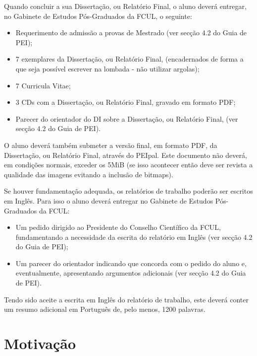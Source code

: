 Quando concluir a sua Dissertação, ou Relatório Final, o aluno deverá entregar, no Gabinete de Estudos Pós-Graduados da FCUL, o seguinte:

\begin{itemize}
\item Requerimento de admissão a provas de Mestrado (ver secção 4.2 do Guia de PEI);
\item 7 exemplares da Dissertação, ou Relatório Final, (encadernados de forma a que seja possível escrever na lombada - não utilizar argolas);
\item 7 Curricula Vitae;
\item 3 CDs com a Dissertação, ou Relatório Final, gravado em formato PDF;
\item Parecer do orientador do DI sobre a Dissertação, ou Relatório Final, (ver secção 4.2 do Guia de PEI).
\end{itemize}

O aluno deverá também submeter a versão final, em formato PDF, da Dissertação, ou Relatório Final, através do PEIpal. Este documento não deverá, em condições normais, exceder os 5MiB (se isso acontecer então deve ser revista a qualidade das imagens evitando a inclusão de bitmaps).

Se houver fundamentação adequada, os relatórios de trabalho poderão ser escritos em Inglês. Para isso o aluno deverá entregar no Gabinete de Estudos Pós-Graduados da FCUL:

\begin{itemize}
\item Um pedido dirigido ao Presidente do Conselho Científico da FCUL, fundamentando a necessidade da escrita do relatório em Inglês (ver secção 4.2 do Guia de PEI);
\item Um parecer do orientador indicando que concorda com o pedido do aluno e, eventualmente, apresentando argumentos adicionais (ver secção 4.2 do Guia de PEI).
\end{itemize}

Tendo sido aceite a escrita em Inglês do relatório de trabalho, este deverá conter um resumo adicional em Português de, pelo menos, 1200 palavras.

\section{Motivação}

